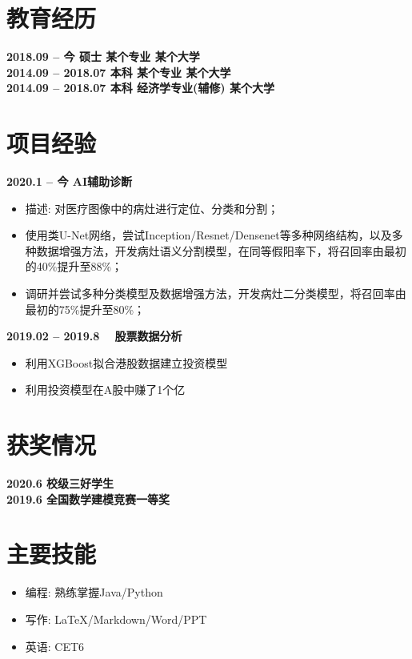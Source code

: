 \documentclass{cv}
\begin{document}



\maketitle

\section{教育经历}

\textbf{2018.09 -- 今 \quad 硕士 \quad 某个专业 \hfill 某个大学}\\
\textbf{2014.09 -- 2018.07 \quad 本科 \quad 某个专业 \hfill 某个大学}\\
\textbf{2014.09 -- 2018.07 \quad 本科 \quad 经济学专业(辅修) \hfill 某个大学}


\section{项目经验}

\textbf{2020.1 -- 今 \quad AI辅助诊断}
\begin{itemize}
	\item 描述: 对医疗图像中的病灶进行定位、分类和分割；
	\item 使用类U-Net网络，尝试Inception/Resnet/Densenet等多种网络结构，以及多种数据增强方法，开发病灶语义分割模型，在同等假阳率下，将召回率由最初的40\%提升至88\%；
	\item 调研并尝试多种分类模型及数据增强方法，开发病灶二分类模型，将召回率由最初的75\%提升至80\%；
\end{itemize}

\textbf{2019.02 -- 2019.8 \quad　股票数据分析}
\begin{itemize}
	\item 利用XGBoost拟合港股数据建立投资模型
	\item 利用投资模型在A股中赚了1个亿
\end{itemize}

\section{获奖情况}

\textbf{2020.6 \quad 校级三好学生}\\
\textbf{2019.6 \quad 全国数学建模竞赛一等奖}

\section{主要技能}

\begin{itemize}
	\item 编程: 熟练掌握Java/Python 
	\item 写作: \LaTeX/Markdown/Word/PPT
	\item 英语: CET6
\end{itemize}
\end{document}
